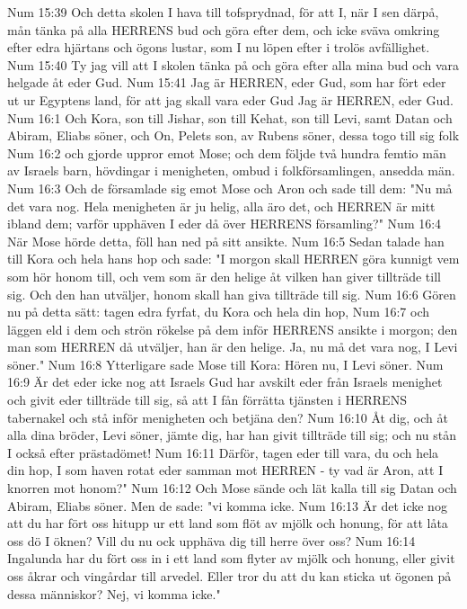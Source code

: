 Num 15:39  Och detta skolen I hava till tofsprydnad, för att I, när I sen därpå, mån tänka på alla HERRENS bud och göra efter dem, och icke sväva omkring efter edra hjärtans och ögons lustar, som I nu löpen efter i trolös avfällighet.
Num 15:40  Ty jag vill att I skolen tänka på och göra efter alla mina bud och vara helgade åt eder Gud.
Num 15:41  Jag är HERREN, eder Gud, som har fört eder ut ur Egyptens land, för att jag skall vara eder Gud Jag är HERREN, eder Gud.
Num 16:1  Och Kora, son till Jishar, son till Kehat, son till Levi, samt Datan och Abiram, Eliabs söner, och On, Pelets son, av Rubens söner, dessa togo till sig folk
Num 16:2  och gjorde uppror emot Mose; och dem följde två hundra femtio män av Israels barn, hövdingar i menigheten, ombud i folkförsamlingen, ansedda män.
Num 16:3  Och de församlade sig emot Mose och Aron och sade till dem: "Nu må det vara nog. Hela menigheten är ju helig, alla äro det, och HERREN är mitt ibland dem; varför upphäven I eder då över HERRENS församling?"
Num 16:4  När Mose hörde detta, föll han ned på sitt ansikte.
Num 16:5  Sedan talade han till Kora och hela hans hop och sade: "I morgon skall HERREN göra kunnigt vem som hör honom till, och vem som är den helige åt vilken han giver tillträde till sig. Och den han utväljer, honom skall han giva tillträde till sig.
Num 16:6  Gören nu på detta sätt: tagen edra fyrfat, du Kora och hela din hop,
Num 16:7  och läggen eld i dem och strön rökelse på dem inför HERRENS ansikte i morgon; den man som HERREN då utväljer, han är den helige. Ja, nu må det vara nog, I Levi söner."
Num 16:8  Ytterligare sade Mose till Kora: Hören nu, I Levi söner.
Num 16:9  Är det eder icke nog att Israels Gud har avskilt eder från Israels menighet och givit eder tillträde till sig, så att I fån förrätta tjänsten i HERRENS tabernakel och stå inför menigheten och betjäna den?
Num 16:10  Åt dig, och åt alla dina bröder, Levi söner, jämte dig, har han givit tillträde till sig; och nu stån I också efter prästadömet!
Num 16:11  Därför, tagen eder till vara, du och hela din hop, I som haven rotat eder samman mot HERREN - ty vad är Aron, att I knorren mot honom?"
Num 16:12  Och Mose sände och lät kalla till sig Datan och Abiram, Eliabs söner. Men de sade: "vi komma icke.
Num 16:13  Är det icke nog att du har fört oss hitupp ur ett land som flöt av mjölk och honung, för att låta oss dö I öknen? Vill du nu ock upphäva dig till herre över oss?
Num 16:14  Ingalunda har du fört oss in i ett land som flyter av mjölk och honung, eller givit oss åkrar och vingårdar till arvedel. Eller tror du att du kan sticka ut ögonen på dessa människor? Nej, vi komma icke."
